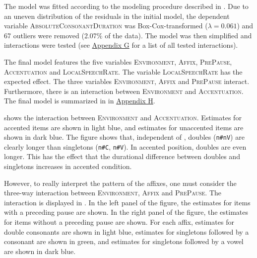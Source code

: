 The model was fitted according to the modeling procedure described in . Due to an uneven distribution of the residuals in the initial model, the dependent variable \textsc{AbsoluteConsonantDuration} was Box-Cox-transformed ($\lambda = 0.061$) and 67 outliers were removed (2.07\% of the data).
The model was then simplified and interactions were tested (see \hyperref[Appendix G Summaries of tested interactions in experimental study]{Appendix G} for a list of all tested interactions).


The final model features the five variables \textsc{Environment}, \textsc{Affix}, \textsc{PrePause}, \textsc{Accentuation} and \textsc{LocalSpeechRate}. The variable \textsc{LocalSpeechRate} has the expected effect. The three variables \textsc{Environment}, \textsc{Affix} and \textsc{PrePause} interact. Furthermore, there is an interaction between \textsc{Environment} and \textsc{Accentuation}. The final model is summarized in  in \hyperref[Appendix H: Model Summaries Experiment]{Appendix H}.


 shows the interaction between \textsc{Environment} and \textsc{Accentuation}. Estimates for accented items are shown in light blue, and estimates  for unaccented items are shown in dark blue. The figure shows that, independent of , doubles (\texttt{n\#nV}) are clearly longer than singletons (\texttt{n\#C}, \texttt{n\#V}). In accented position, doubles are even longer. This has the effect that the durational difference between doubles and singletons increases in accented condition.

 However, to really interpret the  pattern of the affixes, one must consider the three-way interaction between \textsc{Environment}, \textsc{Affix} and \textsc{PrePause}. The interaction is displayed in . In the left panel of the figure, the estimates for items with a preceding pause are shown. In the right panel of the figure, the estimates for items without a preceding pause are shown. For each affix, estimates for double consonants are shown in light blue, estimates for singletons followed by a consonant are shown in green, and estimates for singletons followed by a vowel are shown in dark blue.

